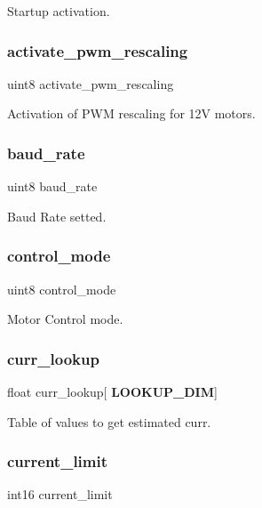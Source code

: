 Startup activation. \mbox{\label{structst__mem_a53d9d645351f4020826ab8c56c91b244}} 
\subsubsection{activate\+\_\+pwm\+\_\+rescaling}
{\footnotesize\ttfamily uint8 activate\+\_\+pwm\+\_\+rescaling}

Activation of P\+WM rescaling for 12V motors. \mbox{\label{structst__mem_a1a2b3002580421effeca67955a862580}} 
\subsubsection{baud\+\_\+rate}
{\footnotesize\ttfamily uint8 baud\+\_\+rate}

Baud Rate setted. \mbox{\label{structst__mem_af0c55b7d870673f2f6e9521c215d4b51}} 
\subsubsection{control\+\_\+mode}
{\footnotesize\ttfamily uint8 control\+\_\+mode}

Motor Control mode. \mbox{\label{structst__mem_a29cec4cab946141aae2509b04e2f5097}} 
\subsubsection{curr\+\_\+lookup}
{\footnotesize\ttfamily float curr\+\_\+lookup[\textbf{ L\+O\+O\+K\+U\+P\+\_\+\+D\+IM}]}

Table of values to get estimated curr. \mbox{\label{structst__mem_a96f2aec80e40c1bbe82186a4261ab7ac}} 
\subsubsection{current\+\_\+limit}
{\footnotesize\ttfamily int16 current\+\_\+limit}

